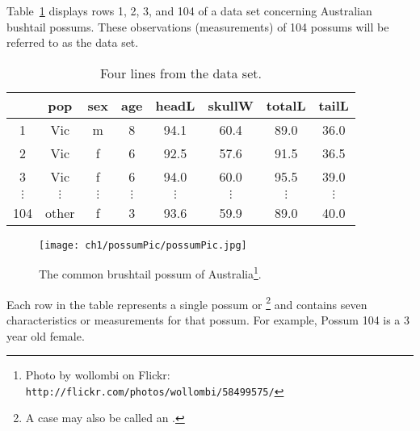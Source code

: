 Table~\ref{possumDF} displays rows 1, 2, 3, and 104 of a data set concerning Australian bushtail possums. These observations (measurements) of 104 possums will be referred to as the  data set.
\begin{table}
\begin{center}
\begin{tabular}{ccc ccc cc}
  \hline
& pop & sex & age & headL & skullW & totalL & tailL \\
  \hline
1 & Vic & m & 8 & 94.1 & 60.4 & 89.0 & 36.0 \\
2 & Vic & f & 6 & 92.5 & 57.6 & 91.5 & 36.5 \\
3 & Vic & f & 6 & 94.0 & 60.0 & 95.5 & 39.0 \\
$\vdots$ & $\vdots$ & $\vdots$ & $\vdots$ & $\vdots$ & $\vdots$ & $\vdots$ & $\vdots$ \\
104 & other & f & 3 & 93.6 & 59.9 & 89.0 & 40.0 \\
   \hline
\end{tabular}
\end{center}
\caption{Four lines from the  data set.}
\label{possumDF}
\end{table}
\begin{figure}
\begin{center}
\texttt{[image: ch1/possumPic/possumPic.jpg]} \\
\begin{minipage}{\textwidth}
   \caption[possums]{The common brushtail possum of Australia\footnote{Photo by wollombi on Flickr: \texttt{http://flickr.com/photos/wollombi/58499575/}}.}
   \label{possumPic}
\end{minipage}
\end{center}
\end{figure}

Each row in the table represents a single possum or \footnote{A case may also be called an .} and contains seven characteristics or measurements for that possum. For example, Possum 104 is a 3 year old female.

